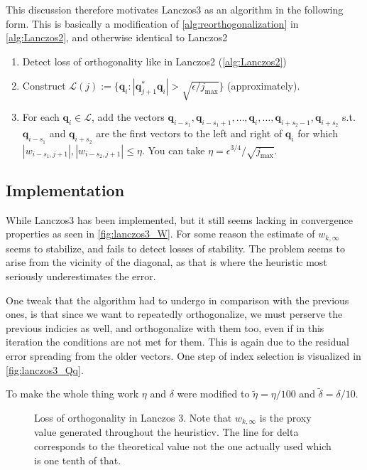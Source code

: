 \documentclass{article}
\begin{document}
This discussion therefore motivates Lanczos3 as an algorithm in the following form. This is basically a modification of \autoref{alg:reorthogonalization} in \autoref{alg:Lanczos2}, and otherwise identical to Lanczos2
\begin{enumerate}
	\item Detect loss of orthogonality like in Lanczos2 (\autoref{alg:Lanczos2})
	\item Construct $\mathcal{L}(j):=\{\mathbf{q}_i:|\mathbf{q}_{j+1}^{\ast}\mathbf{q}_{i}|>\sqrt{\epsilon/j_{\text{max}}}\}$ (approximately).
	\item For each $\mathbf{q}_i\in\mathcal{L}$, add the vectors $\mathbf{q}_{i-s_1},\mathbf{q}_{i-s_1+1},\ldots,\mathbf{q}_{i},\ldots,\mathbf{q}_{i+s_2-1},\mathbf{q}_{i+s_2}$ s.t. $\mathbf{q}_{i-s_1}$ and $\mathbf{q}_{i+s_2}$ are the first vectors to the left and right of $\mathbf{q}_{i}$ for which $|w_{i-s_1,j+1}|,|w_{i-s_2,j+1}|\leq\eta$. You can take $\eta=\epsilon^{3/4}/\sqrt{j_{\text{max}}}$. 
\end{enumerate}

\subsection*{Implementation}

While Lanczos3 has been implemented, but it still seems lacking in convergence properties as seen in \autoref{fig:lanczos3_W}. For some reason the estimate of $w_{k,\infty}$ seems to stabilize, and fails to detect losses of stability. The problem seems to arise from the vicinity of the diagonal, as that is where the heuristic most seriously underestimates the error.

One tweak that the algorithm had to undergo in comparison with the previous ones, is that since we want to repeatedly orthogonalize, we must perserve the previous indicies as well, and orthogonalize with them too, even if in this iteration the conditions are not met for them. This is again due to the residual error spreading from the older vectors. One step of index selection is visualized in \autoref{fig:lanczos3_Qq}.

To make the whole thing work $\eta$ and $\delta$ were modified to $\tilde{\eta} = \eta/100$ and $\tilde{\delta} = \delta/10$. 

\begin{figure}
	\centering
	\resizebox{\textwidth}{!}{
		}
	\caption{Loss of orthogonality in Lanczos 3. Note that $w_{k,\infty}$ is the proxy value generated throughout the heuristicv. The line for delta corresponds to the theoretical value not the one actually used which is one tenth of that.}\label{fig:lanczos3_W}
\end{figure}
\end{document}
